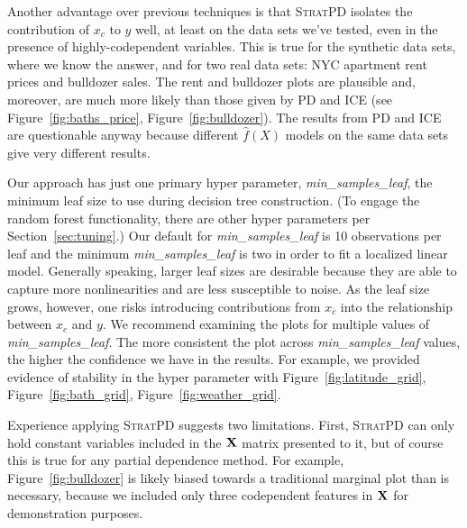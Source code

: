 \documentclass[12pt]{article}
\newcommand{\secref}[1]{Section~\ref{#1}}
\newcommand{\figref}[1]{Figure~\ref{#1}}
\newcommand{\spd}{\fontfamily{cmr}\textsc{\small StratPD}}
\newcommand{\xnc}{$x_{\overline{c}}$}
\begin{document}
Another advantage over previous techniques is that \spd{} isolates the contribution of $x_c$ to $y$ well, at least on the data sets we've tested, even in the presence of highly-codependent variables. This is true for the synthetic data sets, where we know the answer, and for two real data sets: NYC apartment rent prices and bulldozer sales. The rent and bulldozer plots are plausible and, moreover, are much more likely than those given by PD and ICE (see \figref{fig:baths_price}, \figref{fig:bulldozer}).  The results from PD and ICE are questionable anyway because different $\widehat{f}(X)$ models on the same data sets give very different results.

Our approach has just one primary hyper parameter, {\it min\_samples\_leaf}, the minimum leaf size to use during decision tree construction. (To engage the random forest functionality, there are other hyper parameters per \secref{sec:tuning}.) Our default for {\it min\_samples\_leaf} is 10 observations per leaf and the minimum {\it min\_samples\_leaf} is two in order to fit a localized linear model.  Generally speaking, larger leaf sizes are desirable because they are able to capture more nonlinearities and are less susceptible to noise.  As the leaf size grows, however, one risks introducing contributions from \xnc{} into the relationship between $x_c$ and $y$. We recommend examining the plots  for multiple values of {\it min\_samples\_leaf}. The more consistent the plot across {\it min\_samples\_leaf} values, the higher the confidence we have in the results. For example, we provided evidence of stability in the hyper parameter with \figref{fig:latitude_grid}, \figref{fig:bath_grid}, \figref{fig:weather_grid}. 

Experience applying \spd{} suggests two limitations. First, \spd{} can only hold constant variables included in the $\bf X$ matrix presented to it, but of course this is true for any partial dependence method. For example, \figref{fig:bulldozer} is likely biased towards a traditional marginal plot than is necessary, because we included only three codependent features in $\bf X$ for demonstration purposes.  
\end{document}
